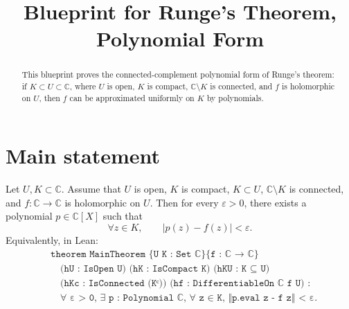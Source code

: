 \documentclass[a4paper]{article}
\title{Blueprint for Runge's Theorem, Polynomial Form}
\author{}
\date{}
\newcommand{\C}{\mathbb{C}}
\newcommand{\eps}{\varepsilon}
\begin{document}
\maketitle

\begin{abstract}
This blueprint proves the connected-complement polynomial form of Runge's
theorem: if \(K \subset U \subset \C\), where \(U\) is open, \(K\) is compact,
\(\C \setminus K\) is connected, and \(f\) is holomorphic on \(U\), then \(f\)
can be approximated uniformly on \(K\) by polynomials.
\end{abstract}

\tableofcontents

\section{Main statement}

\begin{theorem}
\label{thm:main}
Let \(U,K \subset \C\). Assume that \(U\) is open, \(K\) is compact,
\(K \subset U\), \(\C \setminus K\) is connected, and \(f : \C \to \C\) is
holomorphic on \(U\). Then for every \(\eps > 0\), there exists a polynomial
\(p \in \C[X]\) such that
\[
  \forall z \in K,\qquad |p(z)-f(z)| < \eps .
\]
Equivalently, in Lean:
\[
\begin{aligned}
&\texttt{theorem MainTheorem \{U K : Set ℂ\} \{f : ℂ → ℂ\}}\\
&\quad \texttt{(hU : IsOpen U) (hK : IsCompact K) (hKU : K ⊆ U)}\\
&\quad \texttt{(hKc : IsConnected (Kᶜ)) (hf : DifferentiableOn ℂ f U) :}\\
&\quad \texttt{∀ ε > 0, ∃ p : Polynomial ℂ, ∀ z ∈ K, ‖p.eval z - f z‖ < ε.}
\end{aligned}
\]
\end{theorem}
\end{document}
